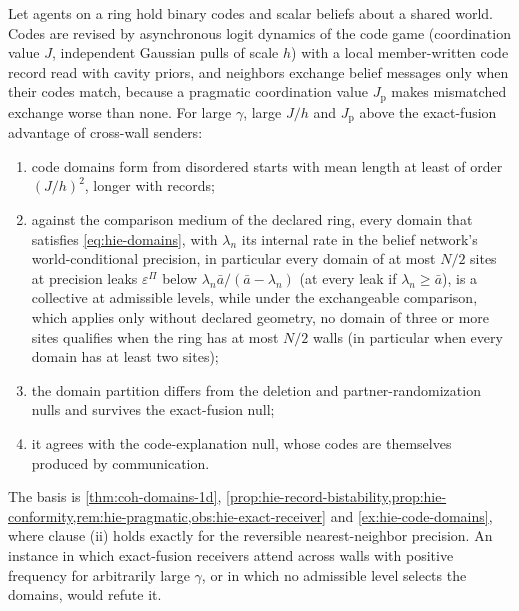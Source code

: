 \begin{conjecture}\label{conj:hie-conformity-formation}
Let agents on a ring hold binary codes and scalar beliefs about a shared world. Codes are revised by asynchronous logit dynamics of the code game (coordination value $J$, independent Gaussian pulls of scale $h$) with a local member-written code record read with cavity priors, and neighbors exchange belief messages only when their codes match, because a pragmatic coordination value $J_{\mathrm p}$ makes mismatched exchange worse than none. For large $\gamma$, large $J/h$ and $J_{\mathrm p}$ above the exact-fusion advantage of cross-wall senders:
\begin{enumerate}
\item[(i)] code domains form from disordered starts with mean length at least of order $(J/h)^2$, longer with records;
\item[(ii)] against the comparison medium of the declared ring, every domain that satisfies \eqref{eq:hie-domains}, with $\lambda_n$ its internal rate in the belief network's world-conditional precision, in particular every domain of at most $N/2$ sites at precision leaks $\varepsilon^\Pi$ below $\lambda_n\bar a/(\bar a-\lambda_n)$ (at every leak if $\lambda_n\ge\bar a$), is a collective at admissible levels, while under the exchangeable comparison, which applies only without declared geometry, no domain of three or more sites qualifies when the ring has at most $N/2$ walls (in particular when every domain has at least two sites);
\item[(iii)] the domain partition differs from the deletion and partner-randomization nulls and survives the exact-fusion null;
\item[(iv)] it agrees with the code-explanation null, whose codes are themselves produced by communication.
\end{enumerate}
\end{conjecture}

The basis is \cref{thm:coh-domains-1d}, \cref{prop:hie-record-bistability,prop:hie-conformity,rem:hie-pragmatic,obs:hie-exact-receiver} and \cref{ex:hie-code-domains}, where clause (ii) holds exactly for the reversible nearest-neighbor precision. An instance in which exact-fusion receivers attend across walls with positive frequency for arbitrarily large $\gamma$, or in which no admissible level selects the domains, would refute it.

